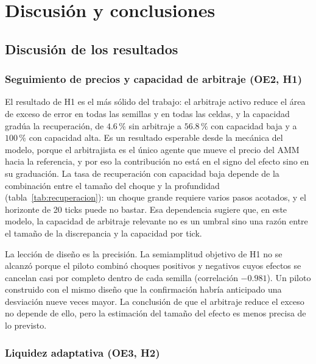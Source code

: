 \chapter{Discusión y conclusiones}
\label{cap:discusion}

\section{Discusión de los resultados}

\subsection{Seguimiento de precios y capacidad de arbitraje (OE2, H1)}

El resultado de H1 es el más sólido del trabajo: el arbitraje activo reduce el área de exceso de error en todas las semillas y en todas las celdas, y la capacidad gradúa la recuperación, de $4.6\,\%$ sin arbitraje a $56.8\,\%$ con capacidad baja y a $100\,\%$ con capacidad alta. Es un resultado esperable desde la mecánica del modelo, porque el arbitrajista es el único agente que mueve el precio del AMM hacia la referencia, y por eso la contribución no está en el signo del efecto sino en su graduación. La tasa de recuperación con capacidad baja depende de la combinación entre el tamaño del choque y la profundidad (tabla~\ref{tab:recuperacion}): un choque grande requiere varios pasos acotados, y el horizonte de 20 ticks puede no bastar. Esa dependencia sugiere que, en este modelo, la capacidad de arbitraje relevante no es un umbral sino una razón entre el tamaño de la discrepancia y la capacidad por tick.

La lección de diseño es la precisión. La semiamplitud objetivo de H1 no se alcanzó porque el piloto combinó choques positivos y negativos cuyos efectos se cancelan casi por completo dentro de cada semilla (correlación $-0.981$). Un piloto construido con el mismo diseño que la confirmación habría anticipado una desviación nueve veces mayor. La conclusión de que el arbitraje reduce el exceso no depende de ello, pero la estimación del tamaño del efecto es menos precisa de lo previsto.

\subsection{Liquidez adaptativa (OE3, H2)}

